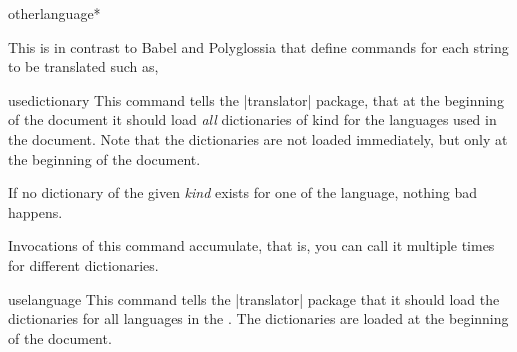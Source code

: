 \begin{docCommandd}{otherlanguage*} { }
\begin{teX}

\end{teX} 

This is in contrast to Babel and Polyglossia that define
commands for each string to be translated such as,

\begin{phdverbatim}
\def\captionsdutch{%
    \def\prefacename{Voorwoord}%
    \def\refname{Referenties}%
    \def\abstractname{Samenvatting}%
    \def\bibname{Bibliografie}%
    \def\chaptername{Hoofdstuk}%
    \def\appendixname{Bijlage}%
    ...
    \def\proofname{Bewijs}%
    \def\glossaryname{Verklarende woordenlijst}%
    \def\today{\number\day~\ifcase\month%
      \or januari\or februari\or maart\or april\or mei\or juni\or
      juli\or augustus\or september\or oktober\or november\or
      december\fi
      \space \number\year}}
\end{phdverbatim}

\begin{docCommand}{usedictionary}{}
  This command tells the |translator| package, that at the beginning of
  the document it should load \textit{all} dictionaries of kind  for
  the languages used in the document. Note that the dictionaries are
  not loaded immediately, but only at the beginning of the document.

  If no dictionary of the given \emph{kind} exists for one of the
  language, nothing bad happens.

  Invocations of this command accumulate, that is, you can call it
  multiple times for different dictionaries.
\end{docCommand}

\begin{docCommand}{uselanguage}{}
  This command tells the |translator| package that it should load the
  dictionaries for all languages in the . The
  dictionaries are loaded at the beginning of the document.
\end{docCommand}




\end{docCommandd}
